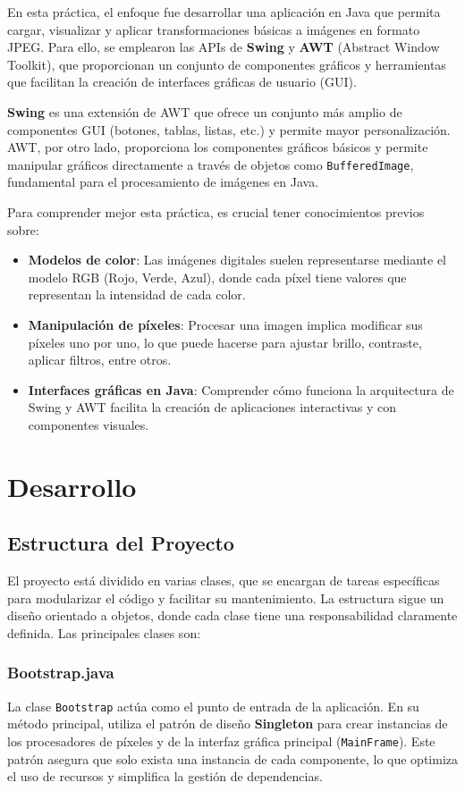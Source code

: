 \documentclass{report}
\begin{document}
  En esta práctica, el enfoque fue desarrollar una aplicación en Java que permita cargar, visualizar y aplicar transformaciones básicas a imágenes en formato JPEG. Para ello, se emplearon las APIs de \textbf{Swing} y \textbf{AWT} (Abstract Window Toolkit), que proporcionan un conjunto de componentes gráficos y herramientas que facilitan la creación de interfaces gráficas de usuario (GUI).

  \textbf{Swing} es una extensión de AWT que ofrece un conjunto más amplio de componentes GUI (botones, tablas, listas, etc.) y permite mayor personalización.
  AWT, por otro lado, proporciona los componentes gráficos básicos y permite manipular gráficos directamente a través de objetos como \texttt{BufferedImage}, fundamental para el procesamiento de imágenes en Java.

  Para comprender mejor esta práctica, es crucial tener conocimientos previos sobre:
  \begin{itemize}
    \item \textbf{Modelos de color}: Las imágenes digitales suelen representarse mediante el modelo RGB (Rojo, Verde, Azul), donde cada píxel tiene valores que representan la intensidad de cada color.
    \item \textbf{Manipulación de píxeles}: Procesar una imagen implica modificar sus píxeles uno por uno, lo que puede hacerse para ajustar brillo, contraste, aplicar filtros, entre otros.
    \item \textbf{Interfaces gráficas en Java}: Comprender cómo funciona la arquitectura de Swing y AWT facilita la creación de aplicaciones interactivas y con componentes visuales.
  \end{itemize}


  \chapter{Desarrollo}\label{ch:desarrollo}


  \section{Estructura del Proyecto}\label{sec:estructura-del-proyecto}
  El proyecto está dividido en varias clases, que se encargan de tareas específicas para modularizar el código y facilitar su mantenimiento.
  La estructura sigue un diseño orientado a objetos, donde cada clase tiene una responsabilidad claramente definida.
  Las principales clases son:

  \subsection{Bootstrap.java}\label{subsec:bootstrap.java}
  La clase \texttt{Bootstrap} actúa como el punto de entrada de la aplicación.
  En su método principal, utiliza el patrón de diseño \textbf{Singleton} para crear instancias de los procesadores de píxeles y de la interfaz gráfica principal (\texttt{MainFrame}). Este patrón asegura que solo exista una instancia de cada componente, lo que optimiza el uso de recursos y simplifica la gestión de dependencias.
\end{document}
